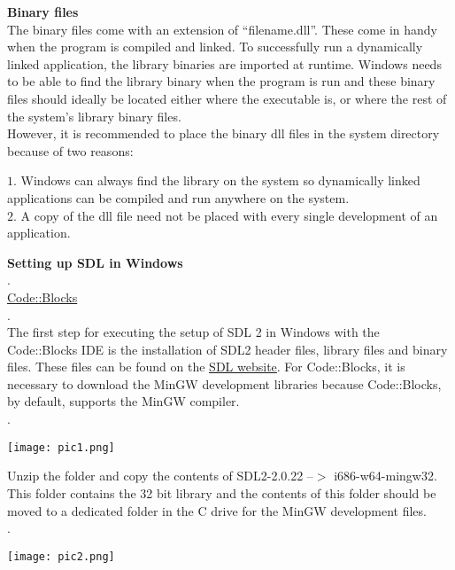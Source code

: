 \documentclass{article}
\begin{document}
\begin{flushleft}
		
		\textbf{Binary files}\\
			
		The binary files come with an extension of “filename.dll”. These come in handy when the program is compiled and linked. To successfully run a dynamically linked application, the library binaries are imported at runtime. Windows needs to be able to find the library binary when the program is run and these binary files should ideally be located either where the executable is, or where the rest of the system's library binary files.  \\
		However, it is recommended to place the binary dll files in the system directory because of two reasons:
		\\
		\begin{flushleft}
			$ 1. $ Windows can always find the library on the system so dynamically linked applications can be compiled and run anywhere on the system.\\
			$ 2. $ A copy of the dll file need not be placed with every single development of an application.\\
		\end{flushleft}
		
		\textbf{Setting up SDL in Windows}\\ 
		.\\
		\underline{Code::Blocks} \\
		.\\
		The first step for executing the setup of SDL 2 in Windows with the Code::Blocks IDE is the installation of SDL2 header files, library files and binary files. These files can be found on the \href{http://www.libsdl.org/download-2.0.php}{\underline{SDL website}}. For Code::Blocks, it is necessary to download the MinGW development libraries because Code::Blocks, by default, supports the MinGW compiler.\\
		.\\
		\begin{center}
				\texttt{[image: pic1.png]}
		\end{center}
	
		Unzip the folder and copy the contents of SDL2-2.0.22 --$ > $ i686-w64-mingw32.\\ This folder contains the 32 bit library and the contents of this folder should be moved to a dedicated folder in the C drive for the MinGW development files. \\.\\
		
		\begin{center}
			\texttt{[image: pic2.png]}
		\end{center}
		

\end{flushleft}
\end{document}

